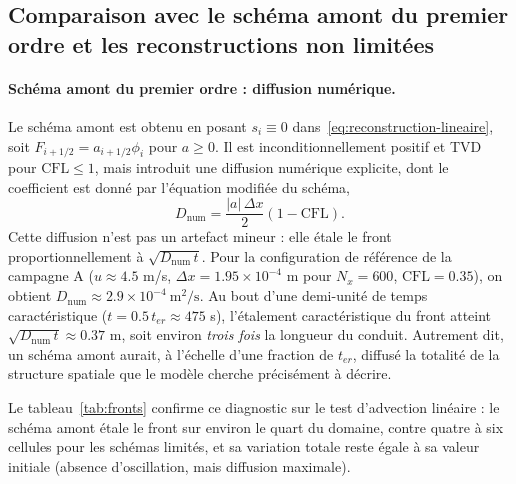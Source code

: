 \documentclass[11pt,a4paper]{report}
\newcommand{\ter}{{t_{er}}}
\newcommand{\Disc}{D_{\mathrm{num}}}
\begin{document}
\subsection{Comparaison avec le schéma amont du premier ordre et les reconstructions non limitées}

\paragraph{Schéma amont du premier ordre : diffusion numérique.} Le schéma amont est obtenu en posant
\(s_i \equiv 0\) dans~\eqref{eq:reconstruction-lineaire}, soit \(F_{i+1/2} = a_{i+1/2}\phi_i\) pour
\(a \ge 0\). Il est inconditionnellement positif et TVD pour \(\mathrm{CFL} \le 1\), mais introduit une
diffusion numérique explicite, dont le coefficient est donné par l'équation modifiée du schéma,
\begin{equation}
\Disc = \frac{|a|\,\Delta x}{2}\left(1 - \mathrm{CFL}\right).
\label{eq:diffnum}
\end{equation}
Cette diffusion n'est pas un artefact mineur : elle étale le front proportionnellement à
\(\sqrt{\Disc\,t}\). Pour la configuration de référence de la campagne A (\(u \approx 4.5\) m/s,
\(\Delta x = 1.95\times10^{-4}\) m pour \(N_x = 600\), \(\mathrm{CFL} = 0.35\)), on obtient
\(\Disc \approx 2.9\times10^{-4}\ \mathrm{m^2/s}\). Au bout d'une demi-unité de temps caractéristique
(\(t = 0.5\,\ter \approx 475\) s), l'étalement caractéristique du front atteint
\(\sqrt{\Disc\,t} \approx 0.37\) m, soit environ \emph{trois fois} la longueur du conduit. Autrement dit,
un schéma amont aurait, à l'échelle d'une fraction de \(\ter\), diffusé la totalité de la structure
spatiale que le modèle cherche précisément à décrire.

Le tableau~\ref{tab:fronts} confirme ce diagnostic sur le test d'advection linéaire : le schéma amont
étale le front sur environ le quart du domaine, contre quatre à six cellules pour les schémas limités,
et sa variation totale reste égale à sa valeur initiale (absence d'oscillation, mais diffusion maximale).
\end{document}
